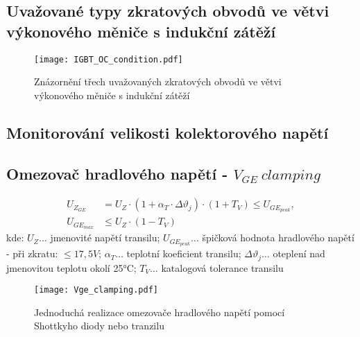      \subsection{Uvažované typy zkratových obvodů ve větvi vý\-ko\-no\-vého měniče s 
     indukční zátěží}
       \begin{figure}[ht!]
         \centering
         \texttt{[image: IGBT\_OC\_condition.pdf]}
         \caption[Kategorie zkratových obvodů]{Znázornění třech uvažovaných zkratových obvodů ve
                  větvi výkonového měniče s indukční zátěží}\label{VE:fig_OC_condition}
       \end{figure}

     \subsection{Monitorování velikosti kolektorového napětí}\label{PVE:Vce_monitoring}
     \subsection{Omezovač hradlového napětí - $V_{GE}\ clamping$}\label{PVE:Vge_clamping}
     \begin{subequations}\label{PVE:eq_Vzge_tranzil}
     \begin{align}
       U_{Z_{GE}}   &=    U_Z\cdot(1+\alpha_T\cdot\Delta\vartheta_j)\cdot(1+T_V)\leq
                          U_{GE_{peak}},                                                      \\
       U_{GE_{max}} &\leq U_Z\cdot(1-T_V)
     \end{align}
     \end{subequations}
     kde: $U_Z\ldots$ jmenovité napětí transilu; $U_{GE_{peak}}\ldots$ špičková hodnota hradlového 
     napě\-tí - při zkratu: $\leq17,5V$; $\alpha_T\ldots$ teplotní koeficient transilu; 
     $\Delta\vartheta_j\ldots$ oteplení nad jmenovitou teplotu okolí 25°C; $T_V\ldots$ katalogová 
     tolerance transilu

       \begin{figure}[ht!]
         \centering
         \texttt{[image: Vge\_clamping.pdf]}
         \caption[Omezovač hradlového napětí]{Jednoduchá realizace omezovače
                  hradlového napětí pomocí Shottkyho diody nebo tranzilu}\label{VE:fig_Vge_clamp}
       \end{figure}

